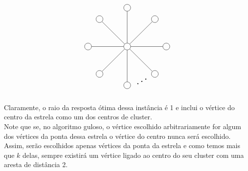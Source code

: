 \documentclass[12pt]{article}
\begin{document}
    \[
    \begin{tikzpicture}
        \def\n{8}
        
        \def\r{2cm}
        
        \def\rotationangle{90}
        
        \draw (0,0) node[circle, draw, minimum size=10pt, inner sep=1.5pt] (center) {};
        
        \begin{scope}[rotate=\rotationangle]
          \foreach \i in {1,...,\n} {
            \draw (\i*360/\n:\r) node[circle, draw, minimum size=10pt, inner sep=1.5pt] (\i) {};
          }
        \end{scope}
        
        \foreach \i in {1,...,\n} {
          \draw (center) -- (\i);
        }
        \draw (4) node[shift={(0.75,0.2)}] {\rotatebox{30}{\scalebox{1.5}{$\ldots$}}} (4);
      \end{tikzpicture}
      \] \\
      Claramente, o raio da resposta ótima dessa instância é 1 e inclui o vértice do centro da estrela como um dos centros de cluster. \\
      Note que se, no algoritmo guloso, o vértice escolhido arbitrariamente for algum dos vértices da ponta dessa estrela o vértice do centro nunca será escolhido. Assim, serão escolhidos apenas vértices da ponta da estrela e como temos mais que $k$ delas, sempre existirá um vértice ligado ao centro do seu cluster com uma aresta de distância 2.
\newpage
\end{document}
